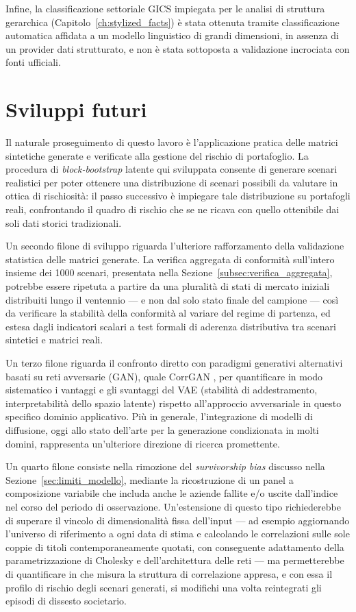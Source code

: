 Infine, la classificazione settoriale GICS impiegata per le analisi di struttura gerarchica (Capitolo~\ref{ch:stylized_facts}) è stata ottenuta tramite classificazione automatica affidata a un modello linguistico di grandi dimensioni, in assenza di un provider dati strutturato, e non è stata sottoposta a validazione incrociata con fonti ufficiali.

\section{Sviluppi futuri}
\label{sec:sviluppi_futuri}

Il naturale proseguimento di questo lavoro è l'applicazione pratica delle matrici sintetiche generate e verificate alla gestione del rischio di portafoglio. La procedura di \emph{block-bootstrap} latente qui sviluppata consente di generare scenari realistici per poter ottenere una distribuzione di scenari possibili da valutare in ottica di rischiosità: il passo successivo è impiegare tale distribuzione su portafogli reali, confrontando il quadro di rischio che se ne ricava con quello ottenibile dai soli dati storici tradizionali.

Un secondo filone di sviluppo riguarda l'ulteriore rafforzamento della validazione statistica delle matrici generate. La verifica aggregata di conformità sull'intero insieme dei 1000 scenari, presentata nella Sezione~\ref{subsec:verifica_aggregata}, potrebbe essere ripetuta a partire da una pluralità di stati di mercato iniziali distribuiti lungo il ventennio --- e non dal solo stato finale del campione --- così da verificare la stabilità della conformità al variare del regime di partenza, ed estesa dagli indicatori scalari a test formali di aderenza distributiva tra scenari sintetici e matrici reali.

Un terzo filone riguarda il confronto diretto con paradigmi generativi alternativi basati su reti avversarie (GAN), quale CorrGAN \citep{marti2019corrgan}, per quantificare in modo sistematico i vantaggi e gli svantaggi del VAE (stabilità di addestramento, interpretabilità dello spazio latente) rispetto all'approccio avversariale in questo specifico dominio applicativo. Più in generale, l'integrazione di modelli di diffusione, oggi allo stato dell'arte per la generazione condizionata in molti domini, rappresenta un'ulteriore direzione di ricerca promettente.

Un quarto filone consiste nella rimozione del \emph{survivorship bias} discusso nella Sezione~\ref{sec:limiti_modello}, mediante la ricostruzione di un panel a composizione variabile che includa anche le aziende fallite e/o uscite dall'indice nel corso del periodo di osservazione. Un'estensione di questo tipo richiederebbe di superare il vincolo di dimensionalità fissa dell'input --- ad esempio aggiornando l'universo di riferimento a ogni data di stima e calcolando le correlazioni sulle sole coppie di titoli contemporaneamente quotati, con conseguente adattamento della parametrizzazione di Cholesky e dell'architettura delle reti --- ma permetterebbe di quantificare in che misura la struttura di correlazione appresa, e con essa il profilo di rischio degli scenari generati, si modifichi una volta reintegrati gli episodi di dissesto societario.

